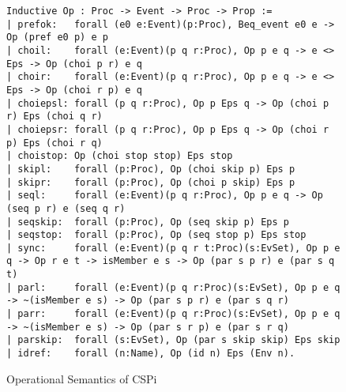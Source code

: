 \documentclass{comjnl}
\begin{document}
\begin{figure*}[!ht]
\caption{\label{fig:my-label} Operational Semantics of CSPi}
\begin{verbatim}
Inductive Op : Proc -> Event -> Proc -> Prop :=
| prefok:   forall (e0 e:Event)(p:Proc), Beq_event e0 e -> Op (pref e0 p) e p
| choil:    forall (e:Event)(p q r:Proc), Op p e q -> e <> Eps -> Op (choi p r) e q
| choir:    forall (e:Event)(p q r:Proc), Op p e q -> e <> Eps -> Op (choi r p) e q
| choiepsl: forall (p q r:Proc), Op p Eps q -> Op (choi p r) Eps (choi q r)
| choiepsr: forall (p q r:Proc), Op p Eps q -> Op (choi r p) Eps (choi r q)
| choistop: Op (choi stop stop) Eps stop
| skipl:    forall (p:Proc), Op (choi skip p) Eps p
| skipr:    forall (p:Proc), Op (choi p skip) Eps p
| seql:     forall (e:Event)(p q r:Proc), Op p e q -> Op (seq p r) e (seq q r)
| seqskip:  forall (p:Proc), Op (seq skip p) Eps p
| seqstop:  forall (p:Proc), Op (seq stop p) Eps stop
| sync:     forall (e:Event)(p q r t:Proc)(s:EvSet), Op p e q -> Op r e t -> isMember e s -> Op (par s p r) e (par s q t)
| parl:     forall (e:Event)(p q r:Proc)(s:EvSet), Op p e q -> ~(isMember e s) -> Op (par s p r) e (par s q r)
| parr:     forall (e:Event)(p q r:Proc)(s:EvSet), Op p e q -> ~(isMember e s) -> Op (par s r p) e (par s r q)
| parskip:  forall (s:EvSet), Op (par s skip skip) Eps skip
| idref:    forall (n:Name), Op (id n) Eps (Env n).
\end{verbatim}
\end{figure*}
\end{document}
